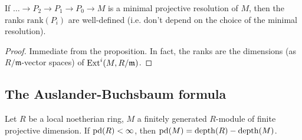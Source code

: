 \begin{corollary}
If $\dots \to P_2 \to P_1 \to P_0 \to M$ is a minimal projective
resolution of
$M$, then the ranks $\mathrm{rank}(P_i)$ are well-defined (i.e.
don't depend
on the choice of the minimal resolution).
\end{corollary}
\begin{proof}
Immediate from the proposition. In fact, the ranks are the
dimensions (as
$R/\mathfrak{m}$-vector spaces) of $\operatorname{Ext}^i(M, R/\mathfrak{m})$.
\end{proof}

\subsection{The Auslander-Buchsbaum formula}



\begin{theorem}
Let $R$ be a local noetherian ring, $M$ a finitely generated $R$-module of
finite
projective dimension. If $\mathrm{pd}(R) <
\infty$, then $\mathrm{pd}(M) = \operatorname{depth}(R) - \operatorname{depth}(M)$.
\end{theorem}

